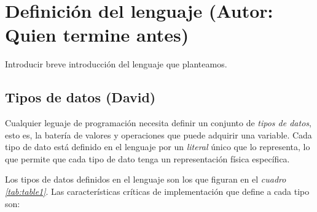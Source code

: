 \documentclass[11pt, english]{article}
\begin{document}
\newcommand{\CC}{C\nolinebreak\hspace{-.05em}\raisebox{.4ex}{\tiny\bf +}\nolinebreak\hspace{-.10em}\raisebox{.4ex}{\tiny\bf +}}
\def\CC{{C\nolinebreak[4]\hspace{-.05em}\raisebox{.4ex}{\tiny\bf ++}}}

\tableofcontents
\newpage

\section{Definición del lenguaje (Autor: Quien termine antes)}\label{Introduction}
Introducir breve introducción del lenguaje que planteamos.
\newpage

\subsection{Tipos de datos (David)}\label{data-type}
Cualquier leguaje de programación necesita definir un conjunto de \emph{tipos de datos}, esto es, la batería de valores y operaciones que puede adquirir una variable. Cada tipo de dato está definido en el lenguaje por un \emph{literal} único que lo representa, lo que permite que cada tipo de dato tenga un representación física específica.

Los tipos de datos definidos en el lenguaje son los que figuran en el \emph{cuadro \ref{tab:table1}}. Las características críticas de implementación que define a cada tipo son:
\end{document}

